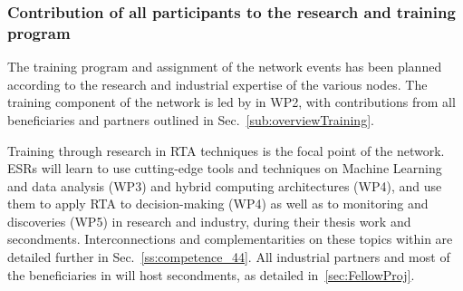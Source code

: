 \subsubsection{Contribution of all participants to the research and training program}
\label{sec:trainingcontrib}


The training program and assignment of the network events has been planned according to the research and industrial expertise of the various nodes.
The training component of the network is led by \unigeentity in WP2, with contributions from all beneficiaries and partners outlined in Sec.~\ref{sub:overviewTraining}.  

Training through research in RTA techniques is the focal point of the network. 
ESRs will learn to use cutting-edge tools and techniques on Machine Learning and data analysis (WP3) and hybrid computing architectures (WP4), and use them to apply RTA to decision-making (WP4) as well as to monitoring and discoveries (WP5) in research and industry, during their thesis work and secondments.
Interconnections and complementarities on these topics within \acronym are detailed further in Sec.~\ref{ss:competence_44}. 
All industrial partners and most of the beneficiaries in \acronym will host secondments, as detailed in~\ref{sec:FellowProj}. 

